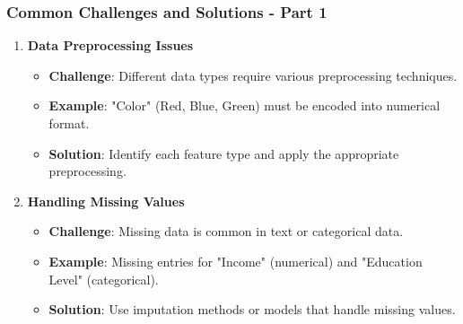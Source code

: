 \documentclass[aspectratio=169]{beamer}
\begin{document}
\begin{frame}[fragile]
    \frametitle{Common Challenges and Solutions - Part 1}
    \begin{enumerate}
        \item \textbf{Data Preprocessing Issues}
        \begin{itemize}
            \item \textbf{Challenge}: Different data types require various preprocessing techniques.
            \item \textbf{Example}: "Color" (Red, Blue, Green) must be encoded into numerical format.
            \item \textbf{Solution}: Identify each feature type and apply the appropriate preprocessing.
        \end{itemize}
        
        \item \textbf{Handling Missing Values}
        \begin{itemize}
            \item \textbf{Challenge}: Missing data is common in text or categorical data.
            \item \textbf{Example}: Missing entries for "Income" (numerical) and "Education Level" (categorical).
            \item \textbf{Solution}: Use imputation methods or models that handle missing values.
        \end{itemize}
    \end{enumerate}
\end{frame}
\end{document}
